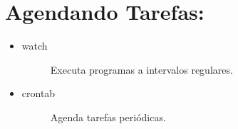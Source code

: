 \documentclass[a4paper,10pt,brazil]{sphinxmanual}
\begin{document}
\section{Agendando Tarefas:}
\label{unix:agendando-tarefas}\begin{itemize}
\item {} \begin{description}
\item[{watch}] \leavevmode
Executa programas a intervalos regulares.

\end{description}

\item {} \begin{description}
\item[{crontab}] \leavevmode
Agenda tarefas periódicas.

\end{description}

\end{itemize}
\end{document}
